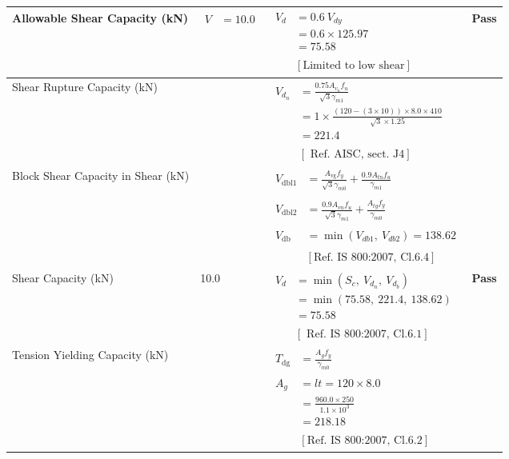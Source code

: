 \documentclass{article}%
\begin{document}
\begin{longtable}{|p{3.5cm}|p{5cm}|p{6cm}|p{1.5cm}|}
\hline%
Allowable Shear Capacity (kN)&$\begin{aligned} V &=10.0 \end{aligned}$&$\begin{aligned} V_{d} &= 0.6~V_{dy}\\ &=0.6 \times125.97\\ &=75.58\\ \\ & [\text{Limited to low shear}] \end{aligned}$&\textcolor{OsdagGreen}{ 
\textbf{Pass}
}\\%
\hline%
Shear Rupture Capacity (kN)&&$\begin{aligned} V_{d_n} &= \frac{0.75 A_{v_n} f_u}{\sqrt{3} \gamma_{m1}}\\ &=1\times \frac{(120-(3\times10))\times8.0\times410}{\sqrt{3}\times1.25}\\ &=221.4\\ \\ & [\text{ Ref. AISC, sect. J4}] \end{aligned}$&\textcolor{OsdagGreen}{ 
\textbf{}
}\\%
\hline%
Block Shear Capacity in Shear (kN)&&$\begin{aligned}V_{\text{dbl1}} &= \frac{A_{\text{vg}} f_{y}}{\sqrt{3} \gamma_{m0}} + \frac{0.9 A_{tn} f_{u}}{\gamma_{m1}}\\ \\ V_{\text{dbl2}} &= \frac{0.9A_{vn} f_{u}}{\sqrt{3} \gamma_{m1}} + \frac{A_{tg} f_{y}}{\gamma_{m0}}\\ \\ V_{\text{db}} &= \min(V_{db1},~ V_{db2})= 138.62\\ \\ & [\text{Ref. IS 800:2007, Cl.6.4}] \end{aligned}$&\textcolor{OsdagGreen}{ 
\textbf{}
}\\%
\hline%
Shear Capacity (kN)&10.0&$\begin{aligned} V_d &= \min(S_c,~V_{d_n},~V_{d_b})\\ &= \min(75.58,~221.4,~138.62)\\ &=75.58\\ \\ & [\text{ Ref. IS 800:2007, Cl.6.1}] \end{aligned}$&\textcolor{OsdagGreen}{ 
\textbf{Pass}
}\\%
\hline%
Tension Yielding Capacity (kN)&&$\begin{aligned} T_{\text{dg}} &= \frac{A_g f_y}{\gamma_{m0}}\\ \\ A_{g} &= l t =120\times8.0\\ &=\frac{960.0\times250}{1.1\times 10^3}\\ &=218.18\\ \\ & [\text{Ref. IS 800:2007, Cl.6.2}] \end{aligned}$&\textcolor{OsdagGreen}{ 
}
\end{longtable}
\end{document}
